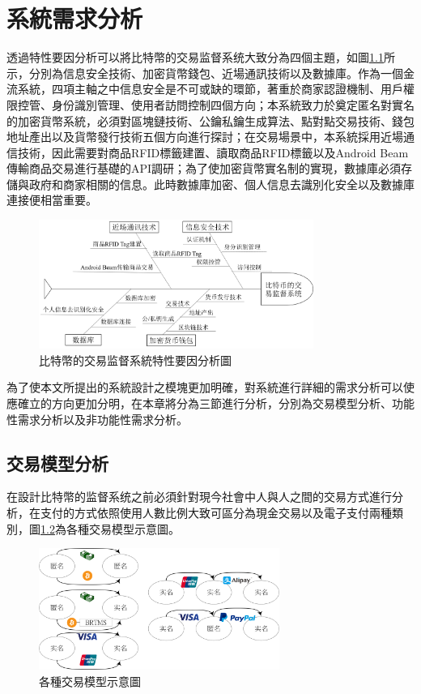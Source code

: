 \chapter{系統需求分析}

透過特性要因分析可以將比特幣的交易监督系统大致分為四個主題，如圖\ref{fish1}所示，分別為信息安全技術、加密貨幣錢包、近場通訊技術以及數據庫。作為⼀個⾦流系統，四項主軸之中信息安全是不可或缺的環節，著重於商家認證機制、用戶權限控管、身份識別管理、使用者訪問控制四個方向；本系統致力於奠定匿名對實名的加密貨幣系統，必須對區塊鏈技術、公鑰私鑰生成算法、點對點交易技術、錢包地址產出以及貨幣發行技術五個方向進行探討；在交易場景中，本系統採用近場通信技術，因此需要對商品RFID標籤建置、讀取商品RFID標籤以及Android Beam傳輸商品交易進行基礎的API調研；為了使加密貨幣實名制的實現，數據庫必須存儲與政府和商家相關的信息。此時數據庫加密、個人信息去識別化安全以及數據庫連接便相當重要。
		\begin{figure}[!htbp]
			\centering
			\includegraphics[width = 0.8\textwidth]{fish1.png}
			\caption{⽐特幣的交易监督系統特性要因分析圖}\label{fish1}
		\end{figure}

為了使本⽂所提出的系統設計之模塊更加明確，對系統進⾏詳細的需求分析可以使應確⽴的⽅向更加分明，在本章將分為三節進行分析，分別為交易模型分析、功能性需求分析以及非功能性需求分析。


\section{交易模型分析}

在設計比特幣的监督系统之前必須針對現今社會中人與人之間的交易方式進行分析，在支付的方式依照使用人數比例大致可區分為現金交易以及電子支付兩種類別，圖\ref{modeall}為各種交易模型示意圖。
\begin{figure}[!htbp]
	\centering
	\includegraphics[width = 0.7\textwidth]{modeall.png}
	\caption{各種交易模型示意圖}\label{modeall}
\end{figure}

